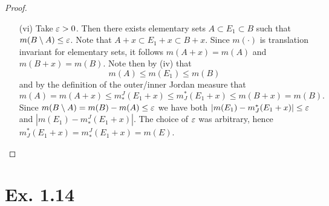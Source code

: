 \documentclass[hw_all.tex]{subfiles}
\begin{document}
\begin{proof}
\begin{enumerate}
        \item[(vi)] Take $\varepsilon > 0$. Then there exists elementary sets $A \subset E_1 \subset B$ such that $m(B \setminus A) \leq \varepsilon$. Note that $A+x \subset E_1 + x \subset B+x$. Since $m(\cdot)$ is translation invariant for elementary sets, it follows $m(A+x) = m(A)$ and $m(B+x) = m(B)$. Note then by (iv) that
            \[
                m(A) \leq m(E_1) \leq m(B) 
            \]
            and by the definition of the outer/inner Jordan measure that
            \[
                m(A) = m(A+x) \leq m^J_*(E_1+x) \leq m_J^*(E_1+x) \leq m(B+x) = m(B)
            .\]
            Since $m(B \setminus A) = m(B) - m(A) \leq \varepsilon$ we have both $|m(E_1) - m_J^*(E_1+x)| \leq \varepsilon$ and $|m(E_1) - m^J_*(E_1+x)|$. The choice of $\varepsilon$ was arbitrary, hence $m_J^*(E_1 + x) = m^J_*(E_1+x) = m(E)$.
    \end{enumerate}
\end{proof}

\section*{Ex. 1.14}
\end{document}
